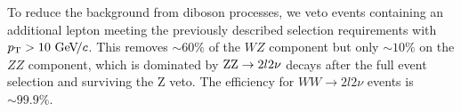 To reduce the background from diboson processes, we veto events
containing an additional lepton meeting the previously described 
selection requirements with $p_\mathrm{T} > 10~\mathrm{Ge\kern -0.1em V}\!/c$.
This removes $\sim 60\%$ of the $WZ$ component but only $\sim 10\%$ 
on the $ZZ$ component, which is dominated by $\mathrm{Z}\mathrm{Z} \to 2l2\nu$ decays 
after the full event selection and surviving the Z veto. The efficiency for 
$WW \to 2l2\nu$ events is $\sim 99.9\%$. 

